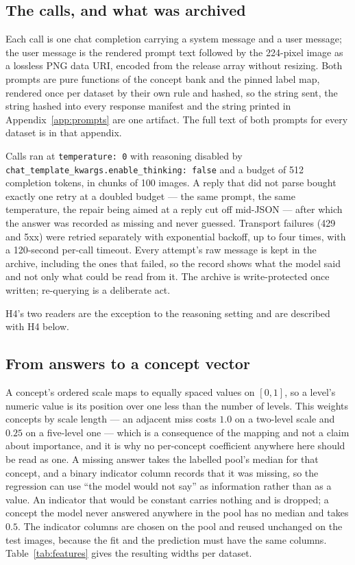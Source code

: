 \documentclass[11pt]{article}
\begin{document}
\subsection{The calls, and what was archived}

Each call is one chat completion carrying a system message and a user message; the user message is
the rendered prompt text followed by the 224-pixel image as a lossless PNG data URI, encoded from
the release array without resizing. Both prompts are pure functions of the concept bank and the
pinned label map, rendered once per dataset by their own rule and hashed, so the string sent, the
string hashed into every response manifest and the string printed in
Appendix~\ref{app:prompts} are one artifact. The full text of both prompts for every dataset is in
that appendix.

Calls ran at \texttt{temperature: 0} with reasoning disabled by
\texttt{chat\_template\_kwargs.enable\_thinking: false} and a budget of 512 completion tokens, in
chunks of 100 images. A reply that did not parse bought exactly one retry at a doubled budget --- the
same prompt, the same temperature, the repair being aimed at a reply cut off mid-JSON --- after
which the answer was recorded as missing and never guessed. Transport failures (429 and 5xx) were
retried separately with exponential backoff, up to four times, with a 120-second per-call timeout.
Every attempt's raw message is kept in the archive, including the ones that failed, so the record
shows what the model said and not only what could be read from it. The archive is write-protected
once written; re-querying is a deliberate act.

H4's two readers are the exception to the reasoning setting and are described with H4 below.

\subsection{From answers to a concept vector}

A concept's ordered scale maps to equally spaced values on $[0,1]$, so a level's numeric value is
its position over one less than the number of levels. This weights concepts by scale length --- an
adjacent miss costs $1.0$ on a two-level scale and $0.25$ on a five-level one --- which is a
consequence of the mapping and not a claim about importance, and it is why no per-concept
coefficient anywhere here should be read as one. A missing answer takes the labelled pool's median
for that concept, and a binary indicator column records that it was missing, so the regression can
use ``the model would not say'' as information rather than as a value. An indicator that would be
constant carries nothing and is dropped; a concept the model never answered anywhere in the pool
has no median and takes $0.5$. The indicator columns are chosen on the pool and reused unchanged on
the test images, because the fit and the prediction must have the same columns.
Table~\ref{tab:features} gives the resulting widths per dataset.
\end{document}
